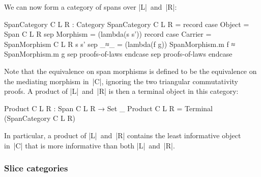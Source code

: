 We can now form a category of spans over |L|~and~|R|:
\begin{code}
SpanCategory C L R : Category
SpanCategory C L R = record
    case  Object    = Span C L R
    sep   Morphism  =
            (lambda(s s')) record
              case   Carrier  = SpanMorphism C L R s s'
              sep    _≈_      = (lambda(f g)) SpanMorphism.m f ≈ SpanMorphism.m g
              sep    proofs-of-laws endcase
    sep   proofs-of-laws endcase
\end{code}
Note that the equivalence on span morphisms is defined to be the equivalence on the mediating morphism in~|C|, ignoring the two triangular commutativity proofs.
A product of |L|~and~|R| is then a terminal object in this category:
\begin{code}
Product C L R : Span C L R → Set _
Product C L R = Terminal (SpanCategory C L R)
\end{code}
In particular, a product of |L|~and~|R| contains the least informative object in~|C| that is more informative than both |L|~and~|R|.

\subsubsection{Slice categories}

